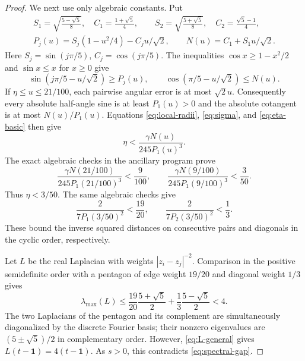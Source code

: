 \documentclass[11pt]{article}
\theoremstyle{remark}
\newcommand{\one}{\mathbf 1}
\numberwithin{equation}{section}
\begin{document}
\begin{proof}
We next use only algebraic constants. Put
\begin{equation}\label{eq:algebraic-trig}
\begin{gathered}
 S_1=\sqrt{\frac{5-\sqrt5}{8}},\quad C_1=\frac{1+\sqrt5}{4},
 \qquad
 S_2=\sqrt{\frac{5+\sqrt5}{8}},\quad C_2=\frac{\sqrt5-1}{4},\\
 P_j(u)=S_j(1-u^2/4)-C_j u/\sqrt2,\qquad
 N(u)=C_1+S_1u/\sqrt2.
\end{gathered}
\end{equation}
Here $S_j=\sin(j\pi/5)$, $C_j=\cos(j\pi/5)$.
The inequalities $\cos x\ge1-x^2/2$ and $\sin x\le x$ for $x\ge0$
give
\[
 \sin(j\pi/5-u/\sqrt2)\ge P_j(u),\qquad
 \cos(\pi/5-u/\sqrt2)\le N(u).
\]
If $\eta\le u\le21/100$, each pairwise angular error is at most
$\sqrt2u$. Consequently every absolute half-angle sine is at least
$P_1(u)>0$ and the absolute cotangent is at most $N(u)/P_1(u)$.
Equations \eqref{eq:local-radii}, \eqref{eq:sigma}, and
\eqref{eq:eta-basic} then give
\begin{equation}\label{eq:algebraic-iteration}
 \eta<\frac{\gamma N(u)}{245P_1(u)^3}.
\end{equation}
The exact algebraic checks in the ancillary program prove
\begin{equation}\label{eq:two-steps}
 \frac{\gamma N(21/100)}{245P_1(21/100)^3}<\frac9{100},
 \qquad
 \frac{\gamma N(9/100)}{245P_1(9/100)^3}<\frac3{50}.
\end{equation}
Thus $\eta<3/50$. The same algebraic checks give
\begin{equation}\label{eq:weights}
 \frac{2}{7P_1(3/50)^2}<\frac{19}{20},\qquad
 \frac{2}{7P_2(3/50)^2}<\frac13.
\end{equation}
These bound the inverse squared distances on consecutive pairs
and diagonals in the cyclic order, respectively.

Let $L$ be the real Laplacian with weights $|z_i-z_j|^{-2}$.
Comparison in the positive semidefinite order with a pentagon of
edge weight $19/20$ and diagonal weight $1/3$ gives
\begin{equation}\label{eq:spectral-gap}
 \lambda_{\max}(L)\le
 \frac{19}{20}\frac{5+\sqrt5}{2}
 +\frac13\frac{5-\sqrt5}{2}<4.
\end{equation}
The two Laplacians of the pentagon and its complement are simultaneously
diagonalized by the discrete Fourier basis; their nonzero eigenvalues
are $(5\pm\sqrt5)/2$ in complementary order.
However, \eqref{eq:L-general} gives $L(t-\one)=4(t-\one)$.
As $s>0$, this contradicts \eqref{eq:spectral-gap}.
\end{proof}
\end{document}
